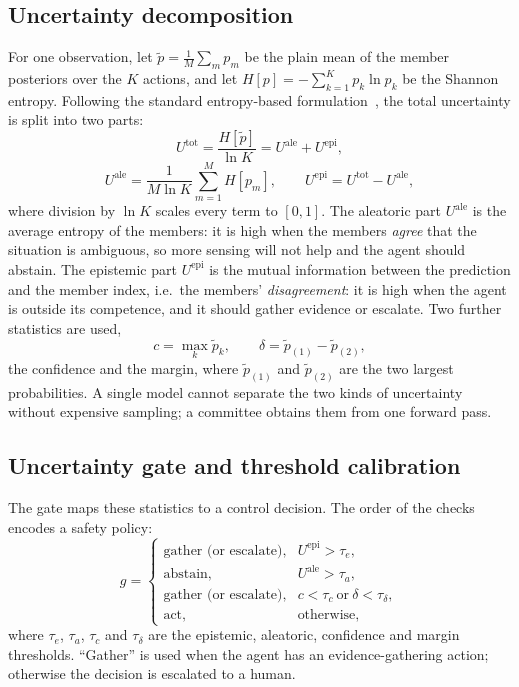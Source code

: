 \documentclass[journal]{IEEEtran}
\begin{document}
\subsection{Uncertainty decomposition}\label{sec:uncertainty}
For one observation, let $\tilde{p}=\frac{1}{M}\sum_{m}p_m$ be the plain mean
of the member posteriors over the $K$ actions, and let
$H[p]=-\sum_{k=1}^{K}p_k\ln p_k$ be the Shannon entropy. Following the standard
entropy-based formulation~\cite{hullermeier2021aleatoric}, the total
uncertainty is split into two parts:
\begin{equation}
U^{\mathrm{tot}}=\frac{H[\tilde{p}]}{\ln K}=U^{\mathrm{ale}}+U^{\mathrm{epi}},
\label{eq:decomp}
\end{equation}
\begin{equation}
U^{\mathrm{ale}}=\frac{1}{M\ln K}\sum_{m=1}^{M}H[p_m],\qquad
U^{\mathrm{epi}}=U^{\mathrm{tot}}-U^{\mathrm{ale}},
\label{eq:decomp2}
\end{equation}
where division by $\ln K$ scales every term to $[0,1]$. The aleatoric part
$U^{\mathrm{ale}}$ is the average entropy of the members: it is high when the
members \emph{agree} that the situation is ambiguous, so more sensing will not
help and the agent should abstain. The epistemic part $U^{\mathrm{epi}}$ is the
mutual information between the prediction and the member index, i.e.\ the
members' \emph{disagreement}: it is high when the agent is outside its
competence, and it should gather evidence or escalate. Two further statistics
are used,
\begin{equation}
c=\max_k\tilde{p}_k,\qquad \delta=\tilde{p}_{(1)}-\tilde{p}_{(2)},
\label{eq:conf}
\end{equation}
the confidence and the margin, where $\tilde{p}_{(1)}$ and $\tilde{p}_{(2)}$ are
the two largest probabilities. A single model cannot separate the two kinds of
uncertainty without expensive sampling; a committee obtains them from one
forward pass.

\subsection{Uncertainty gate and threshold calibration}\label{sec:gate}
The gate maps these statistics to a control decision. The order of the checks
encodes a safety policy:
\begin{equation}
g=
\begin{cases}
\text{gather (or escalate)}, & U^{\mathrm{epi}}>\tau_e,\\
\text{abstain}, & U^{\mathrm{ale}}>\tau_a,\\
\text{gather (or escalate)}, & c<\tau_c\ \text{or}\ \delta<\tau_\delta,\\
\text{act}, & \text{otherwise},
\end{cases}
\label{eq:gate}
\end{equation}
where $\tau_e$, $\tau_a$, $\tau_c$ and $\tau_\delta$ are the epistemic, aleatoric,
confidence and margin thresholds. ``Gather'' is used when the agent has an
evidence-gathering action; otherwise the decision is escalated to a human.
\end{document}
